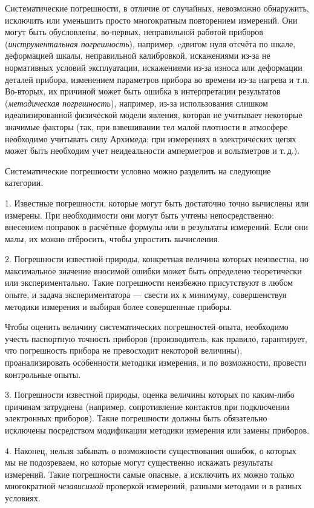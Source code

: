 \documentclass[10pt]{article}
\begin{document}
Систематические погрешности, в отличие от случайных, невозможно обнаружить,
исключить или уменьшить просто многократным повторением измерений.
Они могут быть обусловлены, во-первых, неправильной работой приборов
(\emph{инструментальная погрешность}), например, cдвигом нуля отсчёта
по шкале, деформацией шкалы, неправильной калибровкой, искажениями
из-за не нормативных условий эксплуатации, искажениями из-за износа
или деформации деталей прибора, изменением параметров прибора во времени
из-за нагрева и т.п. Во-вторых, их причиной может быть ошибка в интерпретации
результатов (\emph{методическая погрешность}), например, из-за использования
слишком идеализированной физической модели явления, которая не учитывает
некоторые значимые факторы (так, при взвешивании тел малой плотности
в атмосфере необходимо учитывать силу Архимеда; при измерениях в электрических
цепях может быть необходим учет неидеальности амперметров и вольтметров
и т.\,д.).

Систематические погрешности условно можно разделить на следующие категории.

1. Известные погрешности, которые могут быть достаточно точно вычислены
или измерены. При необходимости они могут быть учтены непосредственно:
внесением поправок в расчётные формулы или в результаты измерений.
Если они малы, их можно отбросить, чтобы упростить вычисления.

2. Погрешности известной природы, конкретная величина которых неизвестна,
но максимальное значение вносимой ошибки может быть определено теоретически
или экспериментально. Такие погрешности неизбежно присутствуют в любом
опыте, и задача экспериментатора --- свести их к минимуму,
совершенствуя методики измерения и выбирая более совершенные приборы.

Чтобы оценить величину систематических погрешностей опыта, необходимо
учесть паспортную точность приборов (производитель, как правило, гарантирует,
что погрешность прибора не превосходит некоторой величины), проанализировать
особенности методики измерения, и по возможности, провести контрольные
опыты.

3. Погрешности известной природы, оценка величины которых по каким-либо
причинам затруднена (например, сопротивление контактов при подключении
электронных приборов). Такие погрешности должны быть обязательно исключены
посредством модификации методики измерения или замены приборов.

4. Наконец, нельзя забывать о возможности существования ошибок, о
которых мы не подозреваем, но которые могут существенно искажать результаты
измерений. Такие погрешности самые опасные, а исключить их можно только
многократной \emph{независимой} проверкой измерений, разными методами
и в разных условиях.
\end{document}
